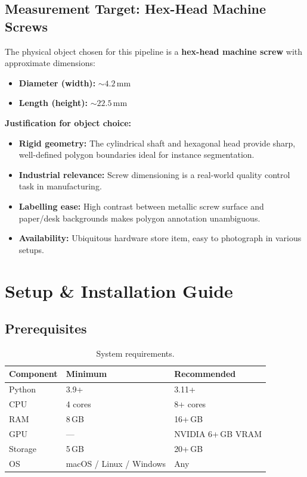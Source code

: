 \documentclass[12pt, a4paper, twoside]{report}
\begin{document}
\section{Measurement Target: Hex-Head Machine Screws}
The physical object chosen for this pipeline is a \textbf{hex-head machine screw} with approximate dimensions:
\begin{itemize}
    \item \textbf{Diameter (width):} $\sim 4.2$\,mm
    \item \textbf{Length (height):} $\sim 22.5$\,mm
\end{itemize}

\noindent\textbf{Justification for object choice:}
\begin{itemize}
    \item \textbf{Rigid geometry:} The cylindrical shaft and hexagonal head provide sharp, well-defined polygon boundaries ideal for instance segmentation.
    \item \textbf{Industrial relevance:} Screw dimensioning is a real-world quality control task in manufacturing.
    \item \textbf{Labelling ease:} High contrast between metallic screw surface and paper/desk backgrounds makes polygon annotation unambiguous.
    \item \textbf{Availability:} Ubiquitous hardware store item, easy to photograph in various setups.
\end{itemize}


\chapter{Setup \& Installation Guide}
\label{ch:setup}

\section{Prerequisites}
\begin{table}[H]
\centering
\caption{System requirements.}
\begin{tabular}{lll}
\toprule
\textbf{Component} & \textbf{Minimum} & \textbf{Recommended} \\
\midrule
Python       & 3.9+      & 3.11+ \\
CPU          & 4 cores   & 8+ cores \\
RAM          & 8\,GB     & 16+\,GB \\
GPU          & ---       & NVIDIA 6+\,GB VRAM \\
Storage      & 5\,GB     & 20+\,GB \\
OS           & macOS / Linux / Windows & Any \\
\bottomrule
\end{tabular}
\end{table}
\end{document}
